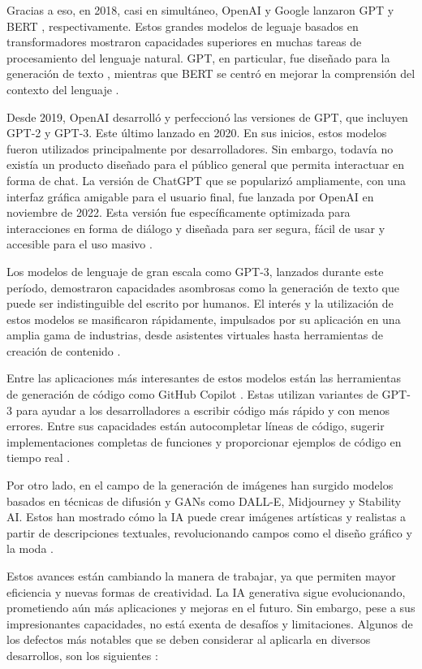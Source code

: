 Gracias a eso, en 2018, casi en simultáneo, OpenAI y Google lanzaron GPT \citep{Radford2018} y BERT \citep{Devlin2018}, respectivamente. Estos grandes modelos de leguaje basados en transformadores mostraron capacidades superiores en muchas tareas de procesamiento del lenguaje natural. GPT, en particular, fue diseñado para la generación de texto \citep{Radford2018}, mientras que BERT se centró en mejorar la comprensión del contexto del lenguaje \citep{Devlin2018}.

Desde 2019, OpenAI desarrolló y perfeccionó las versiones de GPT, que incluyen GPT-2 y GPT-3. Este último lanzado en 2020. En sus inicios, estos modelos fueron utilizados principalmente por desarrolladores. Sin embargo, todavía no existía un producto diseñado para el público general que permita interactuar en forma de chat. La versión de ChatGPT que se popularizó ampliamente, con una interfaz gráfica amigable para el usuario final, fue lanzada por OpenAI en noviembre de 2022. Esta versión fue específicamente optimizada para interacciones en forma de diálogo y diseñada para ser segura, fácil de usar y accesible para el uso masivo \citep{OpenAI2022ChatGPT}.

Los modelos de lenguaje de gran escala como GPT-3, lanzados durante este período, demostraron capacidades asombrosas como la generación de texto que puede ser indistinguible del escrito por humanos. El interés y la utilización de estos modelos se masificaron rápidamente, impulsados por su aplicación en una amplia gama de industrias, desde asistentes virtuales hasta herramientas de creación de contenido \citep{V7Labs2023}.

Entre las aplicaciones más interesantes de estos modelos están las herramientas de generación de código como GitHub Copilot \citep{GitHubCopilot2023}. Estas utilizan variantes de GPT-3 para ayudar a los desarrolladores a escribir código más rápido y con menos errores. Entre sus capacidades están autocompletar líneas de código, sugerir implementaciones completas de funciones y proporcionar ejemplos de código en tiempo real \citep{GitHubCopilot2023}. 

Por otro lado, en el campo de la generación de imágenes han surgido modelos basados en técnicas de difusión y GANs como DALL-E, Midjourney y Stability AI. Estos han mostrado cómo la IA puede crear imágenes artísticas y realistas a partir de descripciones textuales, revolucionando campos como el diseño gráfico y la moda \citep{BattleOfCreativity2024}.

Estos avances están cambiando la manera de trabajar, ya que permiten mayor eficiencia y nuevas formas de creatividad. La IA generativa sigue evolucionando, prometiendo aún más aplicaciones y mejoras en el futuro. Sin embargo, pese a sus impresionantes capacidades, no está exenta de desafíos y limitaciones. Algunos de los defectos más notables que se deben considerar al aplicarla en diversos desarrollos, son los siguientes \citep{TowardsAI2024}:

